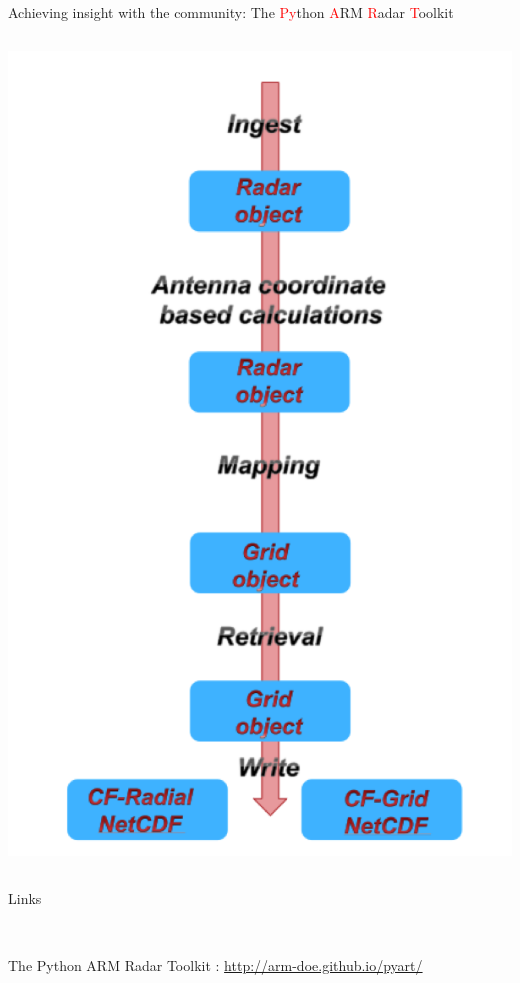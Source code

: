 \documentclass[final]{beamer}
\begin{document}
\begin{frame}{}
\begin{columns}[t]
\begin{column}{.3\linewidth}
\begin{block}{Achieving insight with the community: The \textcolor{red}{Py}thon \textcolor{red}{A}RM \textcolor{red}{R}adar \textcolor{red}{T}oolkit}
\begin{columns}[t]
\begin{column}{.4\linewidth}
                       \includegraphics[width=0.9\linewidth]{figures/pyart-flow}\\[1ex]   
                   \end{column}
               \end{columns}
                       \end{block}
        
         \begin{block}{Links}
         	\begin{columns}[c]
         		\begin{column}{.3\linewidth}
		   		\\
         			The Python ARM Radar Toolkit :
         			{\small \hyperlink{http://arm-doe.github.io/pyart/}{http://arm-doe.github.io/pyart/}} 
         	

\end{column}
\end{columns}
\end{block}
\end{column}
\end{columns}
\end{frame}
\end{document}
